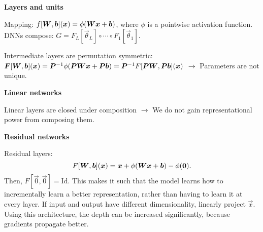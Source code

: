 \documentclass[10pt]{article}
\newenvironment{topic}[1]
{\textbf{\sffamily \colorbox{black}{\rlap{\textbf{\textcolor{white}{#1}}}\hspace{\linewidth}\hspace{-2\fboxsep}}}}
{}
\newenvironment{subtopic}[1]
{\begin{center}\textbf{\sffamily #1}\end{center}}
{}
\begin{document}
\begin{multicols*}{3}
\begin{topic}{Feedforward networks}
        \begin{subtopic}{Layers and units}
            Mapping: $f[\bm{W},\bm{b}](\bm{x}) = \phi(\bm{W}\bm{x}+\bm{b})$, where $\phi$ is a pointwise activation function. DNNs compose: $G = F_L[\vec{\theta}_L] \circ \cdots \circ F_1[\vec{\theta}_1]$.

            Intermediate layers are permutation symmetric: $\bm{F}[\bm{W},\bm{b}](\bm{x}) = \bm{P}^{-1}
                \phi(\bm{P}\bm{W}\bm{x} + \bm{P}\bm{b}) = \bm{P}^{-1} F[\bm{P} \bm{W},
                        \bm{P}\bm{b}](\bm{x})$ $\to$ Parameters are not unique.
        \end{subtopic}

        \begin{subtopic}{Linear networks}
            Linear layers are closed under composition $\to$ We do not gain representational power from composing them.
        \end{subtopic}

        \begin{subtopic}{Residual networks}
            Residual layers: \[
                F[\bm{W},\bm{b}](\bm{x}) = \bm{x} + \phi(\bm{W}\bm{x} + \bm{b}) - \phi(\bm{0}).
            \]
            Then, $F[\vec{0}, \vec{0}] = \mathrm{Id}$. This makes it such that the model learns how to
            incrementally learn a better representation, rather than having to learn it at every layer. If
            input and output have different dimensionality, linearly project $\vec{x}$. Using this
            architecture, the depth can be increased significantly, because gradients propagate better.
        \end{subtopic}


\end{topic}
\end{multicols*}
\end{document}
